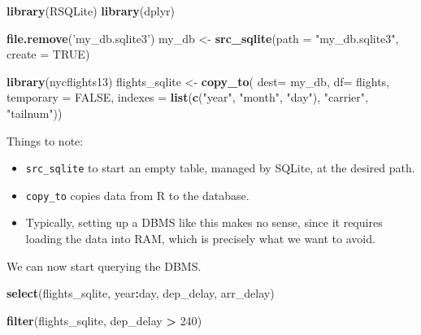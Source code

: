 \documentclass[]{book}
\newenvironment{Shaded}{\begin{snugshade}}{\end{snugshade}}
\newcommand{\KeywordTok}[1]{\textcolor[rgb]{0.13,0.29,0.53}{\textbf{#1}}}
\newcommand{\DataTypeTok}[1]{\textcolor[rgb]{0.13,0.29,0.53}{#1}}
\newcommand{\DecValTok}[1]{\textcolor[rgb]{0.00,0.00,0.81}{#1}}
\newcommand{\StringTok}[1]{\textcolor[rgb]{0.31,0.60,0.02}{#1}}
\newcommand{\OtherTok}[1]{\textcolor[rgb]{0.56,0.35,0.01}{#1}}
\newcommand{\OperatorTok}[1]{\textcolor[rgb]{0.81,0.36,0.00}{\textbf{#1}}}
\newcommand{\NormalTok}[1]{#1}
\providecommand{\tightlist}{%
  \setlength{\itemsep}{0pt}\setlength{\parskip}{0pt}}
\theoremstyle{definition}
\theoremstyle{definition}
\theoremstyle{definition}
\theoremstyle{remark}
\begin{document}
\begin{Shaded}
\begin{Highlighting}[]
\KeywordTok{library}\NormalTok{(RSQLite)}
\KeywordTok{library}\NormalTok{(dplyr)}

\KeywordTok{file.remove}\NormalTok{(}\StringTok{'my_db.sqlite3'}\NormalTok{)}
\NormalTok{my_db <-}\StringTok{ }\KeywordTok{src_sqlite}\NormalTok{(}\DataTypeTok{path =} \StringTok{"my_db.sqlite3"}\NormalTok{, }\DataTypeTok{create =} \OtherTok{TRUE}\NormalTok{)}

\KeywordTok{library}\NormalTok{(nycflights13)}
\NormalTok{flights_sqlite <-}\StringTok{ }\KeywordTok{copy_to}\NormalTok{(}
  \DataTypeTok{dest=}\NormalTok{ my_db, }
  \DataTypeTok{df=}\NormalTok{ flights, }
  \DataTypeTok{temporary =} \OtherTok{FALSE}\NormalTok{, }
  \DataTypeTok{indexes =} \KeywordTok{list}\NormalTok{(}\KeywordTok{c}\NormalTok{(}\StringTok{"year"}\NormalTok{, }\StringTok{"month"}\NormalTok{, }\StringTok{"day"}\NormalTok{), }\StringTok{"carrier"}\NormalTok{, }\StringTok{"tailnum"}\NormalTok{))}
\end{Highlighting}
\end{Shaded}

Things to note:

\begin{itemize}
\tightlist
\item
  \texttt{src\_sqlite} to start an empty table, managed by SQLite, at
  the desired path.
\item
  \texttt{copy\_to} copies data from R to the database.
\item
  Typically, setting up a DBMS like this makes no sense, since it
  requires loading the data into RAM, which is precisely what we want to
  avoid.
\end{itemize}

We can now start querying the DBMS.

\begin{Shaded}
\begin{Highlighting}[]
\KeywordTok{select}\NormalTok{(flights_sqlite, year}\OperatorTok{:}\NormalTok{day, dep_delay, arr_delay)}
\end{Highlighting}
\end{Shaded}

\begin{Shaded}
\begin{Highlighting}[]
\KeywordTok{filter}\NormalTok{(flights_sqlite, dep_delay }\OperatorTok{>}\StringTok{ }\DecValTok{240}\NormalTok{)}
\end{Highlighting}
\end{Shaded}
\end{document}
